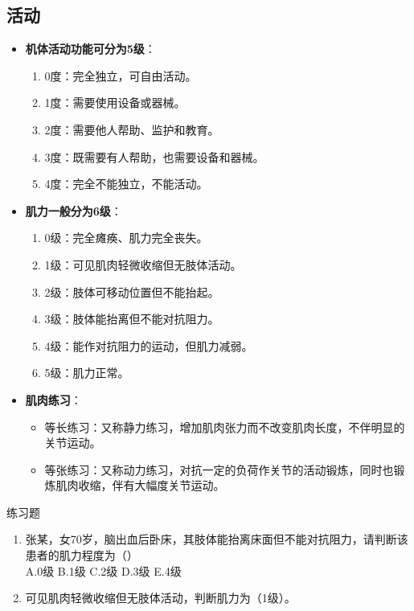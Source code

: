 \documentclass[11pt, a4paper]{ctexart}
\begin{document}
\subsection{活动}
\begin{itemize}
	\item \textbf{机体活动功能可分为5级}：
	      \begin{enumerate}
		      \item 0度：完全独立，可自由活动。
		      \item 1度：需要使用设备或器械。
		      \item 2度：需要他人帮助、监护和教育。
		      \item 3度：既需要有人帮助，也需要设备和器械。
		      \item 4度：完全不能独立，不能活动。
	      \end{enumerate}
	\item \textbf{肌力一般分为6级}：
	      \begin{enumerate}
		      \item 0级：完全瘫痪、肌力完全丧失。
		      \item 1级：可见肌肉轻微收缩但无肢体活动。
		      \item 2级：肢体可移动位置但不能抬起。
		      \item 3级：肢体能抬离但不能对抗阻力。
		      \item 4级：能作对抗阻力的运动，但肌力减弱。
		      \item 5级：肌力正常。
	      \end{enumerate}
	\item \textbf{肌肉练习}：
	      \begin{itemize}
		      \item 等长练习：又称静力练习，增加肌肉张力而不改变肌肉长度，不伴明显的关节运动。
		      \item 等张练习：又称动力练习，对抗一定的负荷作关节的活动锻炼，同时也锻炼肌肉收缩，伴有大幅度关节运动。
	      \end{itemize}
\end{itemize}

\begin{examplebox}{练习题}
	\begin{enumerate}
		\item 张某，女70岁，脑出血后卧床，其肢体能抬离床面但不能对抗阻力，请判断该患者的肌力程度为（\qquad）\\
		      A.0级 \quad B.1级 \quad C.2级 \quad D.3级 \quad E.4级
		\item 可见肌肉轻微收缩但无肢体活动，判断肌力为（1级）。
	\end{enumerate}
\end{examplebox}
\end{document}
